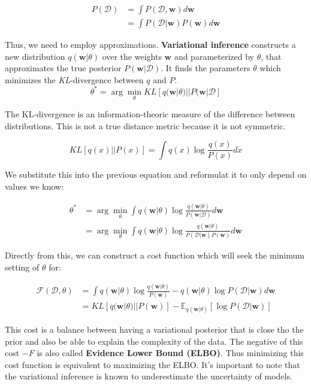 \begin{align}
    P(\mathcal{D}) & = \int P(\mathcal{D}, \mathbf{w}) d\mathbf{w} \\
    & = \int P(\mathcal{D}|\mathbf{w}) P(\mathbf{w}) d\mathbf{w}
\end{align}


Thus, we need to employ approximations. \textbf{Variational inference} constructs a new distribution $q(\mathbf{w}|\theta)$ over the weights $\mathbf{w}$ and parameterized by $\theta$, that approximates the true posterior $P(\mathbf{w}|\mathcal{D})$. It finds the parameters $\theta$ which minimizes the \textit{KL}-divergence between $q$ and $P$.
\begin{equation}
    \theta^* = \arg\min_{\theta}KL[q(\mathbf{w}|\theta) || P(\mathbf{w}|\mathcal{D}]
\end{equation}

The KL-divergence is an information-theoric measure of the difference between distributions. This is not a true distance metric because it is not symmetric.

\begin{equation}
    KL[q(x)||P(x)] = \int q(x) \log \frac{q(x)}{P(x)}dx
\end{equation}

We substitute this into the previous equation and reformulat it to only depend on values we know:

\begin{align}
    \theta^* &= \arg\min_{\theta} \int q(\mathbf{w}|\theta) \log \frac{q(\mathbf{w}|\theta)}{P(\mathbf{w}|\mathcal{D})}d\mathbf{w} \\
    &= \arg\min_{\theta} \int q(\mathbf{w}|\theta) \log \frac{q(\mathbf{w}|\theta)}{P(\mathcal{D}|\mathbf{w})P(\mathbf{w})} d\mathbf{w}
\end{align}

Directly from this, we can construct a cost function which will seek the minimum setting of $\theta$ for:

\begin{align}
    \mathcal{F}(\mathcal{D}, \theta) &= \int q(\mathbf{w}|\theta) \log \frac{q(\mathbf{w}|\theta)}{P(\mathbf{w})} - q(\mathbf{w}|\theta)\log P(\mathcal{D}|\mathbf{w})d\mathbf{w} \\
    &= KL[q(\mathbf{w}|\theta)||P(\mathbf{w})] - \mathbb{E}_{q(\mathbf{w}|\theta)}[\log P(\mathcal{D}|\mathbf{w})]
\end{align}

This cost is a balance between having a variational posterior that is close tho the prior and also be able to explain the complexity of the data. The negative of this cost $-F$ is also called \textbf{Evidence Lower Bound (ELBO)}. Thus minimizing this cost function is equivalent to maximizing the ELBO. It's important to note that the variational inference is known to underestimate the uncertainty of models.


